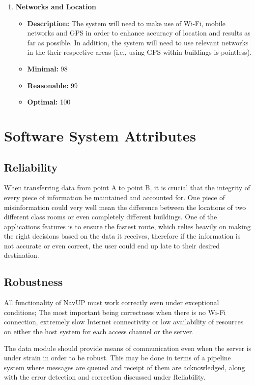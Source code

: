 \documentclass[11pt]{article}
\begin{document}
\begin{enumerate}
		\item \textbf{Networks and Location}
		\begin{itemize}
			\item \textbf{Description:} The system will need to make use of Wi-Fi, mobile networks and GPS in order to enhance accuracy of location and results as far as possible. In addition, the system will need to use relevant networks in the their respective areas (i.e., using GPS within buildings is pointless).
			\item \textbf{Minimal:} 98%
			\item \textbf{Reasonable:} 99%
			\item \textbf{Optimal:} 100%
		\end{itemize}
\end{enumerate}
	
	\section{Software System Attributes}
	\subsection{Reliability}
	When transferring data from point A to point B, it is crucial that the integrity of every piece of information be maintained and accounted for.  One piece of misinformation could very well mean the difference between the locations of two different class rooms or even completely different buildings.  One of the applications features is to ensure the fastest route, which relies heavily on making the right decisions based on the data it receives, therefore if the information is not accurate or even correct, the user could end up late to their desired destination.
	\subsection{Robustness}
	All functionality of NavUP must work correctly even under exceptional conditions; The most important being correctness when there is no Wi-Fi connection, extremely slow Internet connectivity or low availability of resources on either the host system for each access channel or the server.
	
	The data module should provide means of communication even when the server is under strain in order to be robust. This may be done in terms of a pipeline system where messages are queued and receipt of them are acknowledged, along with the error detection and correction discussed under Reliability.
\end{document}
